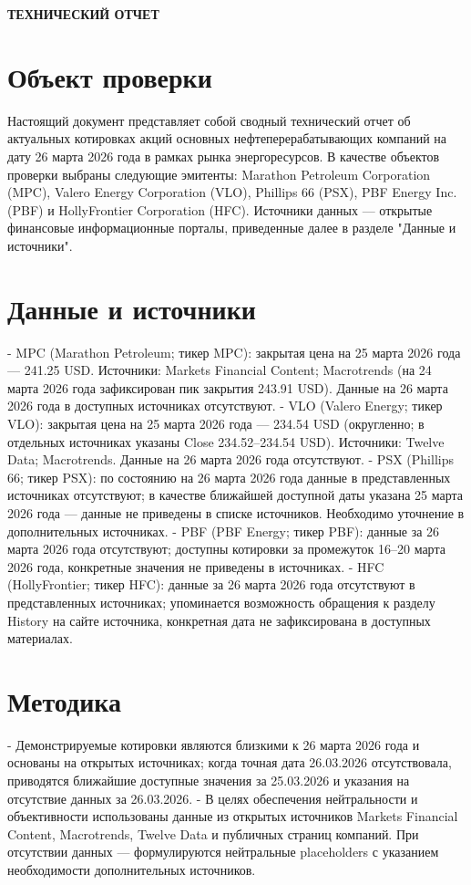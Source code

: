 \documentclass[12pt]{article}
\begin{document}
\begin{center}
\textbf{\LARGE ТЕХНИЧЕСКИЙ ОТЧЕТ}
\end{center}

\vspace{1cm}


\section*{Объект проверки}
Настоящий документ представляет собой сводный технический отчет об актуальных котировках акций основных нефтеперерабатывающих компаний на дату 26 марта 2026 года в рамках рынка энергоресурсов. В качестве объектов проверки выбраны следующие эмитенты: Marathon Petroleum Corporation (MPC), Valero Energy Corporation (VLO), Phillips 66 (PSX), PBF Energy Inc. (PBF) и HollyFrontier Corporation (HFC). Источники данных — открытые финансовые информационные порталы, приведенные далее в разделе "Данные и источники".

\section*{Данные и источники}
- MPC (Marathon Petroleum; тикер MPC): закрытая цена на 25 марта 2026 года — 241.25 USD. Источники: Markets Financial Content; Macrotrends (на 24 марта 2026 года зафиксирован пик закрытия 243.91 USD). Данные на 26 марта 2026 года в доступных источниках отсутствуют. 
- VLO (Valero Energy; тикер VLO): закрытая цена на 25 марта 2026 года — 234.54 USD (округленно; в отдельных источниках указаны Close 234.52–234.54 USD). Источники: Twelve Data; Macrotrends. Данные на 26 марта 2026 года отсутствуют.
- PSX (Phillips 66; тикер PSX): по состоянию на 26 марта 2026 года данные в представленных источниках отсутствуют; в качестве ближайшей доступной даты указана 25 марта 2026 года — данные не приведены в списке источников. Необходимо уточнение в дополнительных источниках.
- PBF (PBF Energy; тикер PBF): данные за 26 марта 2026 года отсутствуют; доступны котировки за промежуток 16–20 марта 2026 года, конкретные значения не приведены в источниках.
- HFC (HollyFrontier; тикер HFC): данные за 26 марта 2026 года отсутствуют в представленных источниках; упоминается возможность обращения к разделу History на сайте источника, конкретная дата не зафиксирована в доступных материалах.

\section*{Методика}
- Демонстрируемые котировки являются близкими к 26 марта 2026 года и основаны на открытых источниках; когда точная дата 26.03.2026 отсутствовала, приводятся ближайшие доступные значения за 25.03.2026 и указания на отсутствие данных за 26.03.2026.
- В целях обеспечения нейтральности и объективности использованы данные из открытых источников Markets Financial Content, Macrotrends, Twelve Data и публичных страниц компаний. При отсутствии данных — формулируются нейтральные placeholders с указанием необходимости дополнительных источников.
\end{document}
